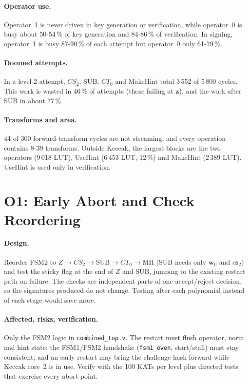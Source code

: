 \documentclass[12pt,a4paper]{report}
\newcommand{\code}[1]{\texttt{#1}}
\begin{document}
\paragraph{Operator use.}
Operator~1 is never driven in key generation or verification, while operator~0 is busy about 50-54\,\% of key generation and 84-86\,\% of verification. In signing, operator~1 is busy 87-90\,\% of each attempt but operator~0 only 61-79\,\%.

\paragraph{Doomed attempts.}
In a level-2 attempt, $CS_2$, SUB, $CT_0$ and MakeHint total 3\,552 of 5\,800 cycles. This work is wasted in 46\,\% of attempts (those failing at $\mathbf{z}$), and the work after SUB in about 77\,\%.

\paragraph{Transforms and area.}
44 of 300 forward-transform cycles are not streaming, and every operation contains 8-39 transforms. Outside Keccak, the largest blocks are the two operators (9\,018 LUT), UseHint (6\,453 LUT, 12\,\%) and MakeHint (2\,389 LUT). UseHint is used only in verification.

\section{O1: Early Abort and Check Reordering}
\paragraph{Design.}
Reorder FSM2 to $Z\rightarrow CS_2\rightarrow\text{SUB}\rightarrow CT_0\rightarrow\text{MH}$ (SUB needs only $\mathbf{w}_0$ and $c\mathbf{s}_2$) and test the sticky flag at the end of $Z$ and SUB, jumping to the existing restart path on failure. The checks are independent parts of one accept/reject decision, so the signatures produced do not change. Testing after each polynomial instead of each stage would save more.

\paragraph{Affected, risks, verification.}
Only the FSM2 logic in \code{combined\_top.v}. The restart must flush operator, norm and hint state; the FSM1/FSM2 handshake (\code{fsm1\_even}, start/stall) must stay consistent; and an early restart may bring the challenge hash forward while Keccak core~2 is in use. Verify with the 100 KATs per level plus directed tests that exercise every abort point.
\end{document}
